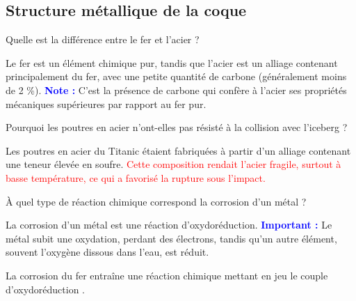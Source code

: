 \documentclass[answers]{exam}
\begin{document}
  \subsection*{Structure métallique de la coque}

  \begin{questions}
  \question[0.5] Quelle est la différence entre le fer et l'acier ?

  \begin{solution}
    Le fer est un élément chimique pur, tandis que l'acier est un alliage contenant principalement du fer, avec une petite quantité de carbone (généralement moins de 2 \%). \textcolor{blue}{\textbf{Note :}} C'est la présence de carbone qui confère à l'acier ses propriétés mécaniques supérieures par rapport au fer pur.
    \end{solution}
    

  \question[0.5] Pourquoi les poutres en acier n'ont-elles pas résisté à la collision avec l'iceberg ?

  \begin{solution}
    Les poutres en acier du Titanic étaient fabriquées à partir d'un alliage contenant une teneur élevée en soufre. \textcolor{red}{Cette composition rendait l'acier fragile, surtout à basse température, ce qui a favorisé la rupture sous l'impact.}
    \end{solution}

  \question[0.5] À quel type de réaction chimique correspond la corrosion d'un métal ?
  \begin{solution}
    La corrosion d'un métal est une réaction d'oxydoréduction. \textcolor{blue}{\textbf{Important :}} Le métal subit une oxydation, perdant des électrons, tandis qu'un autre élément, souvent l'oxygène dissous dans l'eau, est réduit.
    \end{solution}

  \question[1] La corrosion du fer entraîne une réaction chimique mettant en jeu le couple d'oxydoréduction .
\end{questions}
\end{document}
